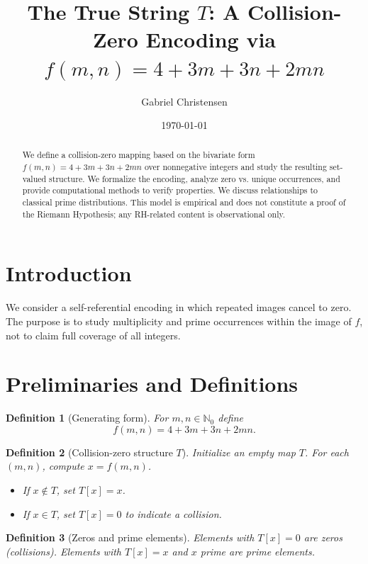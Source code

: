 \documentclass[12pt,a4paper]{article}
\title{The True String \(T\): A Collision-Zero Encoding via \(f(m,n)=4+3m+3n+2mn\)}
\author{Gabriel Christensen}
\date{\today}
\newtheorem{definition}{Definition}[section]
\begin{document}
\maketitle
\begin{abstract}
We define a collision-zero mapping based on the bivariate form \(f(m,n)=4+3m+3n+2mn\) over nonnegative integers and study the resulting set-valued structure. We formalize the encoding, analyze zero vs. unique occurrences, and provide computational methods to verify properties. We discuss relationships to classical prime distributions. This model is empirical and does not constitute a proof of the Riemann Hypothesis; any RH-related content is observational only.
\end{abstract}

\tableofcontents
\newpage

\section{Introduction}
We consider a self-referential encoding in which repeated images cancel to zero. The purpose is to study multiplicity and prime occurrences within the image of \(f\), not to claim full coverage of all integers.

\section{Preliminaries and Definitions}
\begin{definition}[Generating form]\label{def:f}
For \(m,n\in\mathbb{N}_0\) define
\[
 f(m,n) = 4 + 3m + 3n + 2mn.
\]
\end{definition}

\begin{definition}[Collision-zero structure \(T\)]\label{def:T}
Initialize an empty map \(T\). For each \((m,n)\), compute \(x = f(m,n)\).
\begin{itemize}
    \item If \(x\notin T\), set \(T[x]=x\).
    \item If \(x\in T\), set \(T[x]=0\) to indicate a collision.
\end{itemize}
\end{definition}

\begin{definition}[Zeros and prime elements]
Elements with \(T[x]=0\) are \emph{zeros} (collisions). Elements with \(T[x]=x\) and \(x\) prime are \emph{prime elements}.
\end{definition}
\end{document}
